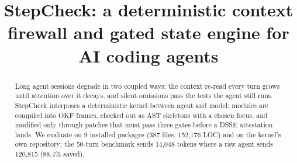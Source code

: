 \documentclass{article}
\title{StepCheck: a deterministic context firewall and gated state engine for AI coding agents}
\begin{document}
\maketitle
\begin{abstract}
Long agent sessions degrade in two coupled ways: the context re-read every turn grows until attention over it decays, and silent omissions pass the tests the agent still runs. StepCheck interposes a deterministic kernel between agent and model: modules are compiled into OKF frames, checked out as AST skeletons with a chosen focus, and modified only through patches that must pass three gates before a DSSE attestation lands. We evaluate on 9 installed packages (387 files, 152,176 LOC) and on the kernel's own repository; the 50-turn benchmark sends 14,048 tokens where a raw agent sends 120,815 (88.4\% saved).
\end{abstract}
\end{document}
